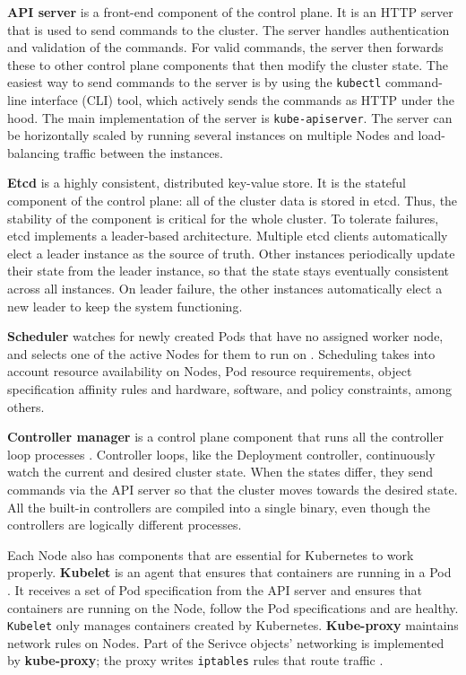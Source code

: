 \documentclass[english, 12pt, a4paper, sci, utf8, a-2b, online]{aaltothesis}
\begin{document}
\textbf{API server} is a front-end component of the control plane. It is an HTTP server that is used to send commands to the cluster. The server handles authentication and validation of the commands. For valid commands, the server then forwards these to other control plane components that then modify the cluster state. The easiest way to send commands to the server is by using the \texttt{kubectl} command-line interface (CLI) tool, which actively sends the commands as HTTP under the hood. The main implementation of the server is \texttt{kube-apiserver}. The server can be horizontally scaled by running several instances on multiple Nodes and load-balancing traffic between the instances.

\textbf{Etcd} \cite{etcd} is a highly consistent, distributed key-value store. It is the stateful component of the control plane: all of the cluster data is stored in etcd. Thus, the stability of the component is critical for the whole cluster. To tolerate failures, etcd implements a leader-based architecture. Multiple etcd clients automatically elect a leader instance as the source of truth. Other instances periodically update their state from the leader instance, so that the state stays eventually consistent across all instances. On leader failure, the other instances automatically elect a new leader to keep the system functioning.

\textbf{Scheduler} watches for newly created Pods that have no assigned worker node, and selects one of the active Nodes for them to run on \cite{k8s-docs-control-plane}. Scheduling takes into account resource availability on Nodes, Pod resource requirements, object specification affinity rules and hardware, software, and policy constraints, among others.

\textbf{Controller manager} is a control plane component that runs all the controller loop processes \cite{k8s-docs-control-plane}. Controller loops, like the Deployment controller, continuously watch the current and desired cluster state. When the states differ, they send commands via the API server so that the cluster moves towards the desired state. All the built-in controllers are compiled into a single binary, even though the controllers are logically different processes.

Each Node also has components that are essential for Kubernetes to work properly. \textbf{Kubelet} is an agent that ensures that containers are running in a Pod \cite{k8s-docs-control-plane}. It receives a set of Pod specification from the API server and ensures that containers are running on the Node, follow the Pod specifications and are healthy. \texttt{Kubelet} only manages containers created by Kubernetes. \textbf{Kube-proxy} maintains network rules on Nodes. Part of the Serivce objects' networking is implemented by \textbf{kube-proxy}; the proxy writes \texttt{iptables} rules that route traffic \cite{cilium-proxy-free}.
\end{document}
